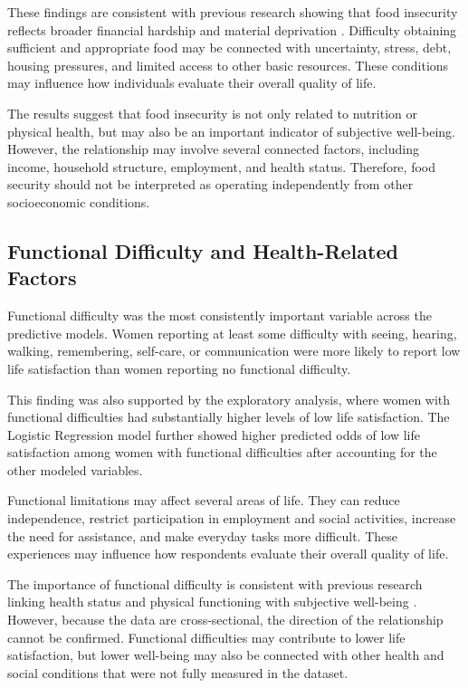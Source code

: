 \documentclass[12pt]{article}
\begin{document}
These findings are consistent with previous research showing that food insecurity reflects broader financial hardship and material deprivation \citep{tarasuk2023}. Difficulty obtaining sufficient and appropriate food may be connected with uncertainty, stress, debt, housing pressures, and limited access to other basic resources. These conditions may influence how individuals evaluate their overall quality of life.

The results suggest that food insecurity is not only related to nutrition or physical health, but may also be an important indicator of subjective well-being. However, the relationship may involve several connected factors, including income, household structure, employment, and health status. Therefore, food security should not be interpreted as operating independently from other socioeconomic conditions.

\subsection{Functional Difficulty and Health-Related Factors}

Functional difficulty was the most consistently important variable across the predictive models. Women reporting at least some difficulty with seeing, hearing, walking, remembering, self-care, or communication were more likely to report low life satisfaction than women reporting no functional difficulty.

This finding was also supported by the exploratory analysis, where women with functional difficulties had substantially higher levels of low life satisfaction. The Logistic Regression model further showed higher predicted odds of low life satisfaction among women with functional difficulties after accounting for the other modeled variables.

Functional limitations may affect several areas of life. They can reduce independence, restrict participation in employment and social activities, increase the need for assistance, and make everyday tasks more difficult. These experiences may influence how respondents evaluate their overall quality of life.

The importance of functional difficulty is consistent with previous research linking health status and physical functioning with subjective well-being \citep{diener1984,denton2004}. However, because the data are cross-sectional, the direction of the relationship cannot be confirmed. Functional difficulties may contribute to lower life satisfaction, but lower well-being may also be connected with other health and social conditions that were not fully measured in the dataset.
\end{document}
